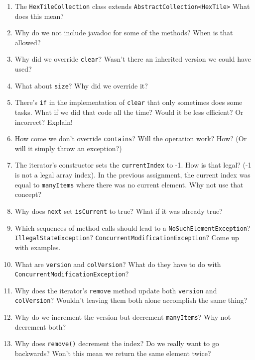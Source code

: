 \begin{enumerate}
   \item The \texttt{HexTileCollection} class extends \verb|AbstractCollection<HexTile>|
      What does this mean?
    \item Why do we not include javadoc for some of the methods?
      When is that allowed?
    \item Why did we override \texttt{clear}? Wasn't there an inherited
      version we could have used?
    \item What about \texttt{size}?  Why did we override it?
    \item There's \texttt{if} in the implementation of \texttt{clear}
      that only sometimes does some tasks. What if we did that code
      all the time?  Would it be less efficient?  Or incorrect?  Explain!
    \item How come we don't override \verb|contains|?  Will the
      operation work?  How? (Or will it simply throw an exception?)
    \item The iterator's constructor sets the \texttt{currentIndex} to
      -1.  How is that legal?  (-1 is not a legal array index).
      In the previous assignment, the current index was equal to
      \texttt{manyItems} where there was no current element.  Why not
      use that concept?
    \item Why does \texttt{next} set \texttt{isCurrent} to true?
      What if it was already true?
    \item Which sequences of method calls should lead to a
      \texttt{NoSuchElementException}? \texttt{IllegalStateException}?
      \texttt{ConcurrentModificationException}? Come up with examples.
    \item What are \texttt{version} and \texttt{colVersion}?
      What do they have to do with \texttt{ConcurrentModificationException}?
    \item Why does the iterator's \texttt{remove} method update both
      \texttt{version} and \texttt{colVersion}? Wouldn't leaving them
      both alone accomplish the same thing?
    \item Why do we increment the version but decrement \texttt{manyItems}?
      Why not decrement both?
    \item Why does \verb|remove()| decrement the index?  Do we
      really want to go backwards?  Won't this mean we return the
      same element twice?
\end{enumerate}
